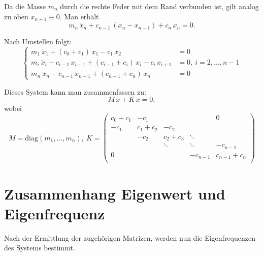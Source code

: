 \documentclass[a4paper,12pt]{report}
\theoremstyle{plain} %
\theoremstyle{definition} %
\theoremstyle{remark}
\begin{document}
            Da die Masse $m_n$ durch die rechte Feder mit dem Rand verbunden ist, gilt analog zu oben $x_{n+1} \equiv 0$.
            Man erhält
            $$m_n\,\ddot x_n + c_{n-1}\,(x_n-x_{n-1}) + c_n\,x_n = 0.$$  

            Nach Umstellen folgt:
            \begin{equation}
                  \label{eqn: System GDgl MK 1d}
                  \begin{cases}
                        m_1\ \ddot x_1 + (c_0+c_1)\,x_1 - c_1\,x_2 & = 0   \\
                        m_i\ \ddot x_i - c_{i-1}\,x_{i-1} + (c_{i-1}+c_i)\,x_i -c_i\,x_{i+1} & = 0,\ i=2,...,n-1 \\
                        m_n\ \ddot x_n - c_{n-1}\,x_{n-1} + (c_{n-1}+c_n)\,x_n & = 0
                  \end{cases}
            \end{equation}

            Dieses System kann man zusammenfassen zu:
            $$M\,\ddot x + K\,x = 0,$$
            \renewcommand{\arraystretch}{1.5}
            wobei $$M= \text{diag}(m_1,\dots,m_n),\ 
            K = \begin{pmatrix}
                  c_0+c_1 & -c_1 &  &  & 0 \\
                  -c_1 & c_1+c_2 & -c_2 &  &  \\
                   & -c_2 & c_2+c_3 & \ddots &  \\
                    &  & \ddots & \ddots  & -c_{n-1} \\
                   0&  & & -c_{n-1} & c_{n-1}+c_n \\
                  \end{pmatrix}$$

                  
            \renewcommand{\arraystretch}{1}

            

      \section{Zusammenhang Eigenwert und Eigenfrequenz}
            Nach der Ermittlung der zugehörigen Matrizen, werden nun die Eigenfrequenzen des Systems bestimmt.
\end{document}
